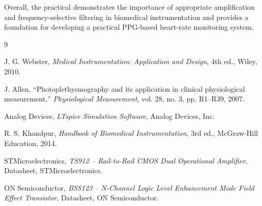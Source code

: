 \documentclass[10pt]{article}
\begin{document}
Overall, the practical demonstrates the importance of appropriate amplification and frequency-selective filtering in biomedical instrumentation and provides a foundation for developing a practical PPG-based heart-rate monitoring system.


\begin{thebibliography}{9}

J. G. Webster,
\textit{Medical Instrumentation: Application and Design},
4th ed., Wiley, 2010.

J. Allen,
``Photoplethysmography and its application in clinical physiological measurement,''
\textit{Physiological Measurement},
vol. 28, no. 3, pp. R1--R39, 2007.

Analog Devices,
\textit{LTspice Simulation Software},
Analog Devices, Inc.

R. S. Khandpur,
\textit{Handbook of Biomedical Instrumentation},
3rd ed., McGraw-Hill Education, 2014.

STMicroelectronics,
\textit{TS912 -- Rail-to-Rail CMOS Dual Operational Amplifier},
Datasheet, STMicroelectronics.

ON Semiconductor,
\textit{BSS123 -- N-Channel Logic Level Enhancement Mode Field Effect Transistor},
Datasheet, ON Semiconductor.

\end{thebibliography}
\end{document}
